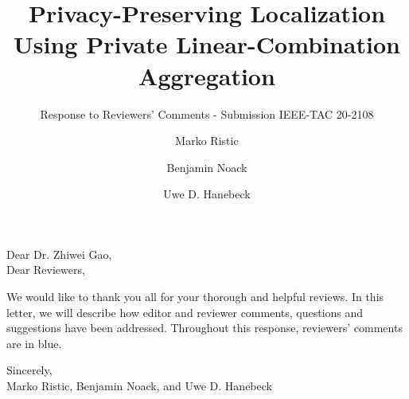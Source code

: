 \documentclass[a4paper]{scrartcl}
\title{\boldmath Privacy-Preserving Localization Using Private Linear-Combination Aggregation}
\subtitle{Response to Reviewers' Comments - Submission IEEE-TAC 20-2108}
\author{Marko Ristic\and Benjamin Noack\and Uwe D. Hanebeck}
\newcommand{\reviewtext}[1]{{\color{nblue} #1}}
\begin{document}
\maketitle

Dear Dr. Zhiwei Gao,\\
Dear Reviewers,

We would like to thank you all for your thorough and helpful reviews. In this letter, we will describe how editor and reviewer comments, questions and suggestions have been addressed. Throughout this response, reviewers' comments are in \reviewtext{blue}. 

Sincerely,\\
Marko Ristic, Benjamin Noack, and Uwe D. Hanebeck

\end{document}

